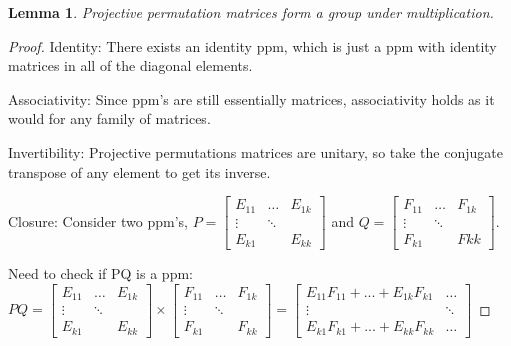 \documentclass[12pt]{article}
\newtheorem{lem}[thm]{Lemma}
\begin{document}
\begin{lem}
Projective permutation matrices form a group under multiplication.
\end{lem}
\begin{proof}
Identity: There exists an identity ppm, which is just a ppm with identity matrices in all of the diagonal elements.

Associativity: Since ppm's are still essentially matrices, associativity holds as it would for any family of matrices.

Invertibility: Projective permutations matrices are unitary, so take the conjugate transpose of any element to get its inverse.

Closure: Consider two ppm's, $P = \begin{bmatrix}
E_{11} & \dots & E_{1k} \\
\vdots  & \ddots \\
E_{k1} &        & E_{kk}
\end{bmatrix}$ and $Q = \begin{bmatrix}
F_{11} & \dots & F_{1k} \\
\vdots  & \ddots \\
F_{k1} &        & F{kk}
\end{bmatrix}$. 

Need to check if PQ is a ppm:
$PQ = \begin{bmatrix}
E_{11} & \dots & E_{1k} \\
\vdots  & \ddots \\
E_{k1} &        & E_{kk}
\end{bmatrix}
\times
\begin{bmatrix}
F_{11} & \dots & F_{1k} \\
\vdots  & \ddots \\
F_{k1} &        & F_{kk}
\end{bmatrix}
= 
\begin{bmatrix}
E_{11}F_{11} + ... + E_{1k}F_{k1} & \dots  \\
\vdots  & \ddots \\
E_{k1}F_{k1} + ... + E_{kk}F_{kk} & \dots
\end{bmatrix}
$
\end{proof}
\end{document}
